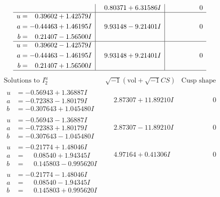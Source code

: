 \documentclass[1p]{elsarticle_modified}
\theoremstyle{definition}
\newcommand{\I}{\sqrt{-1}}
\begin{document}
$$\begin{array}{c|c|c}
 & \phantom{-}0.80371 + 6.31586 I & \phantom{-0.000000 } 0 \\ \hline\begin{aligned}
u &= \phantom{-}0.39602 + 1.42579 I \\
a &= -0.44463 + 1.46195 I \\
b &= \phantom{-}0.21407 - 1.56500 I\end{aligned}
 & \phantom{-}9.93148 - 9.21401 I & \phantom{-0.000000 } 0 \\ \hline\begin{aligned}
u &= \phantom{-}0.39602 - 1.42579 I \\
a &= -0.44463 - 1.46195 I \\
b &= \phantom{-}0.21407 + 1.56500 I\end{aligned}
 & \phantom{-}9.93148 + 9.21401 I & \phantom{-0.000000 } 0\\
 \hline 
 \end{array}$$\newpage$$\begin{array}{c|c|c}  
\text{Solutions to }I^u_{2}& \I (\text{vol} + \sqrt{-1}CS) & \text{Cusp shape}\\
 \hline 
\begin{aligned}
u &= -0.56943 + 1.36887 I \\
a &= -0.72383 - 1.80179 I \\
b &= -0.307643 + 1.045480 I\end{aligned}
 & \phantom{-}2.87307 + 11.89210 I & \phantom{-0.000000 } 0 \\ \hline\begin{aligned}
u &= -0.56943 - 1.36887 I \\
a &= -0.72383 + 1.80179 I \\
b &= -0.307643 - 1.045480 I\end{aligned}
 & \phantom{-}2.87307 - 11.89210 I & \phantom{-0.000000 } 0 \\ \hline\begin{aligned}
u &= -0.21774 + 1.48046 I \\
a &= \phantom{-}0.08540 + 1.94345 I \\
b &= \phantom{-}0.145803 - 0.995620 I\end{aligned}
 & \phantom{-}4.97164 + 0.41306 I & \phantom{-0.000000 } 0 \\ \hline\begin{aligned}
u &= -0.21774 - 1.48046 I \\
a &= \phantom{-}0.08540 - 1.94345 I \\
b &= \phantom{-}0.145803 + 0.995620 I\end{aligned}

\end{array}$$
\end{document}
